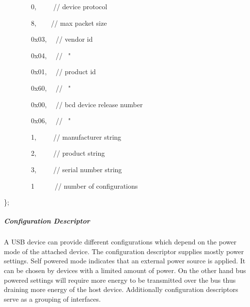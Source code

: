 {~~~~~~~~}{0}{,}{~ ~ ~ }{// device protocol}

{~~~~~~~~}{8}{,}{~ ~ ~}{// max packet size}

{~~~~~~~~}{0x03}{,}{~ ~}{// vendor id}

{~~~~~~~~}{0x04}{,}{~ ~}{// ~"}

{~~~~~~~~}{0x01}{,}{~ ~}{// product id}

{~~~~~~~~}{0x60}{,}{~ ~}{// ~"}

{~~~~~~~~}{0x00}{,}{~ ~}{// bcd device release number}

{~~~~~~~~}{0x06}{,}{~ ~}{// ~"}

{~~~~~~~~}{1}{,}{~ ~ ~ }{// manufacturer string}

{~~~~~~~~}{2}{,}{~ ~ ~ }{// product string}

{~~~~~~~~}{3}{,}{~ ~ ~ }{// serial number string}

{~~~~~~~~}{1}{~ ~ ~ ~}{// number of configurations}

{\};}

\hypertarget{h.73p9cggljvzi}{\subparagraph{\texorpdfstring{{Configuration
Descriptor}}{Configuration Descriptor}}\label{h.73p9cggljvzi}}

{A USB device can provide different configurations which depend on the
power mode of the attached device. The configuration descriptor supplies
mostly power settings. Self powered mode indicates that an external
power source is applied. It can be chosen by devices with a limited
amount of power. On the other hand bus powered settings will require
more energy to be transmitted over the bus thus draining more energy of
the host device. Additionally configuration descriptors serve as a
grouping of interfaces.}

{}

\href{}{}\href{}{}

